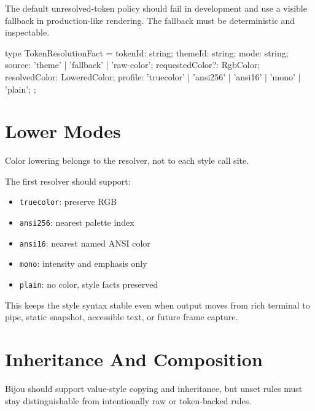 The default unresolved-token policy should fail in development and use a visible fallback in production-like rendering. The fallback must be deterministic and inspectable.

\begin{CodeBlock}
type TokenResolutionFact = {
  tokenId: string;
  themeId: string;
  mode: string;
  source: 'theme' | 'fallback' | 'raw-color';
  requestedColor?: RgbColor;
  resolvedColor: LoweredColor;
  profile: 'truecolor' | 'ansi256' | 'ansi16' | 'mono' | 'plain';
};
\end{CodeBlock}

\section{Lower Modes}\label{record-178-lower-modes}

Color lowering belongs to the resolver, not to each style call site.

The first resolver should support:

\begin{itemize}
\tightlist
\item
  \texttt{t\allowbreak{}r\allowbreak{}u\allowbreak{}e\allowbreak{}c\allowbreak{}o\allowbreak{}l\allowbreak{}o\allowbreak{}r}: preserve RGB
\item
  \texttt{a\allowbreak{}n\allowbreak{}s\allowbreak{}i\allowbreak{}2\allowbreak{}5\allowbreak{}6}: nearest palette index
\item
  \texttt{a\allowbreak{}n\allowbreak{}s\allowbreak{}i\allowbreak{}1\allowbreak{}6}: nearest named ANSI color
\item
  \texttt{m\allowbreak{}o\allowbreak{}n\allowbreak{}o}: intensity and emphasis only
\item
  \texttt{p\allowbreak{}l\allowbreak{}a\allowbreak{}i\allowbreak{}n}: no color, style facts preserved
\end{itemize}

This keeps the style syntax stable even when output moves from rich terminal to pipe, static snapshot, accessible text, or future frame capture.

\section{Inheritance And Composition}\label{record-178-inheritance-and-composition}

Bijou should support value-style copying and inheritance, but unset rules must stay distinguishable from intentionally raw or token-backed rules.

